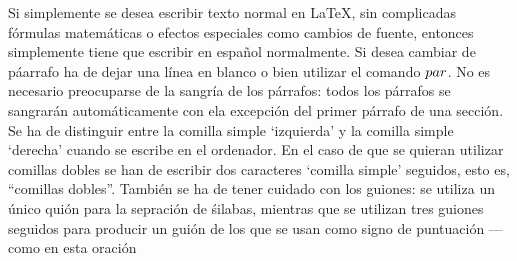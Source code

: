 \documentclass[a4paper,10pt]{letter}
\begin{document}
 Si simplemente se desea escribir texto normal en LaTeX,
 sin complicadas fórmulas matemáticas o efectos especiales
 como cambios de fuente, entonces simplemente tiene que escribir
 en español normalmente.
 Si desea cambiar de páarrafo ha de dejar una línea en blanco o bien
utilizar el comando $\\par$.
 No es necesario preocuparse de la sangría de los párrafos:
 todos los párrafos se sangrarán automáticamente con ela excepción
 del primer párrafo de una sección.
 Se ha de distinguir entre la comilla simple `izquierda'
 y la comilla simple `derecha' cuando se escribe en el ordenador.
 En el caso de que se quieran utilizar comillas dobles se han de
 escribir dos caracteres `comilla simple' seguidos, esto es,
 ``comillas dobles''.
 También se ha de tener cuidado con los guiones: se utiliza un único
 quión para la sepración de śilabas, mientras que se utilizan
 tres guiones seguidos para producir un guión de los que se usan
 como signo de puntuación --- como en esta oración
\end{document}
